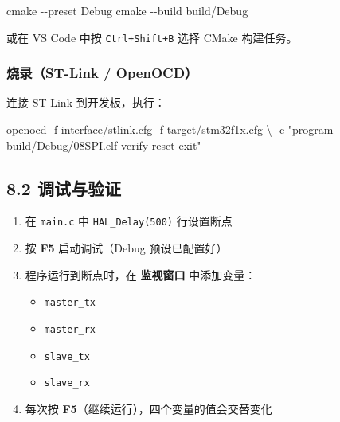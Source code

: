 \documentclass[
  chinese,
  UTF8,
  oneside,
  openany]{ctexbook}
\newenvironment{Shaded}{}{}
\newcommand{\AttributeTok}[1]{\textcolor[rgb]{0.49,0.56,0.16}{#1}}
\newcommand{\DataTypeTok}[1]{\textcolor[rgb]{0.56,0.13,0.00}{#1}}
\newcommand{\ExtensionTok}[1]{#1}
\newcommand{\FunctionTok}[1]{\textcolor[rgb]{0.02,0.16,0.49}{#1}}
\newcommand{\NormalTok}[1]{#1}
\newcommand{\StringTok}[1]{\textcolor[rgb]{0.25,0.44,0.63}{#1}}
\providecommand{\tightlist}{%
  \setlength{\itemsep}{0pt}\setlength{\parskip}{0pt}}
\begin{document}
\begin{Shaded}
\begin{Highlighting}[]
\FunctionTok{cmake} \AttributeTok{{-}{-}preset}\NormalTok{ Debug}
\FunctionTok{cmake} \AttributeTok{{-}{-}build}\NormalTok{ build/Debug}
\end{Highlighting}
\end{Shaded}

或在 VS Code 中按 \texttt{Ctrl+Shift+B} 选择 CMake 构建任务。

\subsubsection{烧录（ST-Link /
OpenOCD）}\label{ux70e7ux5f55st-link-openocd-1}

连接 ST-Link 到开发板，执行：

\begin{Shaded}
\begin{Highlighting}[]
\ExtensionTok{openocd} \AttributeTok{{-}f}\NormalTok{ interface/stlink.cfg }\AttributeTok{{-}f}\NormalTok{ target/stm32f1x.cfg }\DataTypeTok{\textbackslash{}}
        \AttributeTok{{-}c} \StringTok{"program build/Debug/08SPI.elf verify reset exit"}
\end{Highlighting}
\end{Shaded}

\subsection{8.2 调试与验证}\label{ux8c03ux8bd5ux4e0eux9a8cux8bc1}

\begin{enumerate}
\def\labelenumi{\arabic{enumi}.}
\tightlist
\item
  在 \texttt{main.c} 中 \texttt{HAL\_Delay(500)} 行设置断点
\item
  按 \textbf{F5} 启动调试（Debug 预设已配置好）
\item
  程序运行到断点时，在 \textbf{监视窗口} 中添加变量：

  \begin{itemize}
  \tightlist
  \item
    \texttt{master\_tx}
  \item
    \texttt{master\_rx}
  \item
    \texttt{slave\_tx}
  \item
    \texttt{slave\_rx}
  \end{itemize}
\item
  每次按 \textbf{F5}（继续运行），四个变量的值会交替变化
\end{enumerate}
\end{document}
